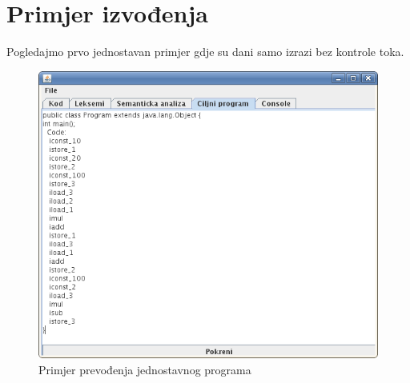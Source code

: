 \section{Primjer izvođenja}

Pogledajmo prvo jednostavan primjer gdje su dani samo izrazi bez kontrole toka.



\begin{figure}[H]
  \centering
    \includegraphics[width=13cm]{primjer-generiranje2}
  \caption{Primjer prevođenja jednostavnog programa}
\end{figure}

